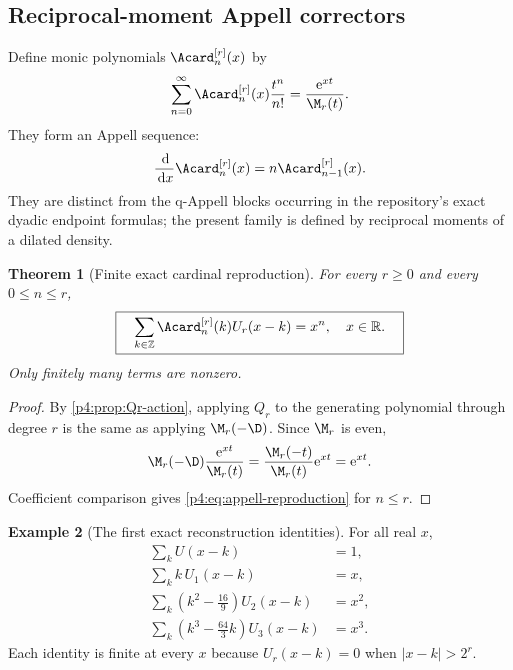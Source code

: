 \documentclass[11pt]{article}
\numberwithin{equation}{section}
\newtheorem{theorem}{Theorem}[section]
\theoremstyle{definition}
\newtheorem{example}[theorem]{Example}
\theoremstyle{remark}
\newcommand{\R}{\mathbb R}
\newcommand{\Z}{\mathbb Z}
\newcommand{\dd}{\,\mathrm d}
\newcommand{\e}{\mathrm e}
\begin{document}
\subsection{Reciprocal-moment Appell correctors}
Define monic polynomials $\Acard_n^{[r]}(x)$ by
\begin{equation}
 \sum_{n=0}^{\infty}\Acard_n^{[r]}(x)\frac{t^n}{n!}
 =\frac{\e^{xt}}{\M_r(t)}.
 \label{p4:eq:appell-generating}
\end{equation}
They form an Appell sequence:
\begin{equation}
 \frac{\dd}{\dd x}\Acard_n^{[r]}(x)=n\Acard_{n-1}^{[r]}(x).
 \label{p4:eq:appell-derivative}
\end{equation}
They are distinct from the q-Appell blocks occurring in the repository's exact dyadic endpoint formulas; the present family is defined by reciprocal moments of a dilated density.

\begin{theorem}[Finite exact cardinal reproduction]
\label{p4:thm:appell-reproduction}
For every $r\ge0$ and every $0\le n\le r$,
\begin{equation}
 \boxed{\quad
 \sum_{k\in\Z}\Acard_n^{[r]}(k)U_r(x-k)=x^n,
 \quad x\in\R.
 \quad}
 \label{p4:eq:appell-reproduction}
\end{equation}
Only finitely many terms are nonzero.
\end{theorem}

\begin{proof}
By \cref{p4:prop:Qr-action}, applying $Q_r$ to the generating polynomial through degree $r$ is the same as applying $\M_r(-\D)$.  Since $\M_r$ is even,
\[
 \M_r(-\D)\frac{\e^{xt}}{\M_r(t)}
 =\frac{\M_r(-t)}{\M_r(t)}\e^{xt}=\e^{xt}.
\]
Coefficient comparison gives \eqref{p4:eq:appell-reproduction} for $n\le r$.
\end{proof}

\begin{example}[The first exact reconstruction identities]
For all real $x$,
\begin{align}
 \sum_kU(x-k)&=1,\\
 \sum_kk\,U_1(x-k)&=x,\\
 \sum_k\left(k^2-\frac{16}{9}\right)U_2(x-k)&=x^2,\\
 \sum_k\left(k^3-\frac{64}{3}k\right)U_3(x-k)&=x^3.
 \label{p4:eq:first-reproductions}
\end{align}
Each identity is finite at every $x$ because $U_r(x-k)=0$ when $|x-k|>2^r$.
\end{example}
\end{document}
